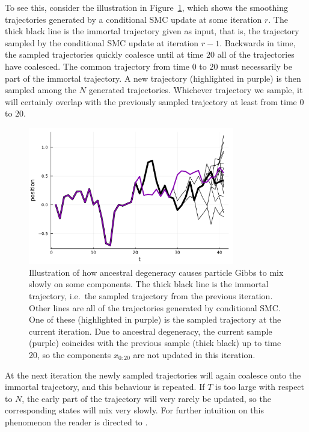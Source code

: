 To see this, consider the illustration in Figure~\ref{fig:PG_ancdegen}, which shows the smoothing trajectories generated by a conditional SMC update at some iteration $r$. The thick black line is the immortal trajectory given as input, that is, the trajectory sampled by the conditional SMC update at iteration $r-1$. Backwards in time, the sampled trajectories quickly coalesce until at time $20$ all of the trajectories have coalesced. The common trajectory from time $0$ to $20$ must necessarily be part of the immortal trajectory.
A new trajectory (highlighted in purple) is then sampled among the $N$ generated trajectories. Whichever trajectory we sample, it will certainly overlap with the previously sampled trajectory at least from time $0$ to $20$.

\begin{figure}[ht]
\centering
\includegraphics[width=0.8\textwidth]{plots/PG_degen.pdf}
\caption[Ancestral degeneracy in particle Gibbs]{Illustration of how ancestral degeneracy causes particle Gibbs to mix slowly on some components. The thick black line is the immortal trajectory, i.e.\ the sampled trajectory from the previous iteration. Other lines are all of the trajectories generated by conditional SMC. One of these (highlighted in purple) is the sampled trajectory at the current iteration. Due to ancestral degeneracy, the current sample (purple) coincides with the previous sample (thick black) up to time 20, so the components $x_{0:20}$ are not updated in this iteration.}
\label{fig:PG_ancdegen}
\end{figure}

At the next iteration the newly sampled trajectories will again coalesce onto the immortal trajectory, and this behaviour is repeated. 
If $T$ is too large with respect to $N$, the early part of the trajectory will very rarely be updated, so the corresponding states will mix very slowly.
For further intuition on this phenomenon the reader is directed to \textcite[Section 5.4]{lindsten2013}.

